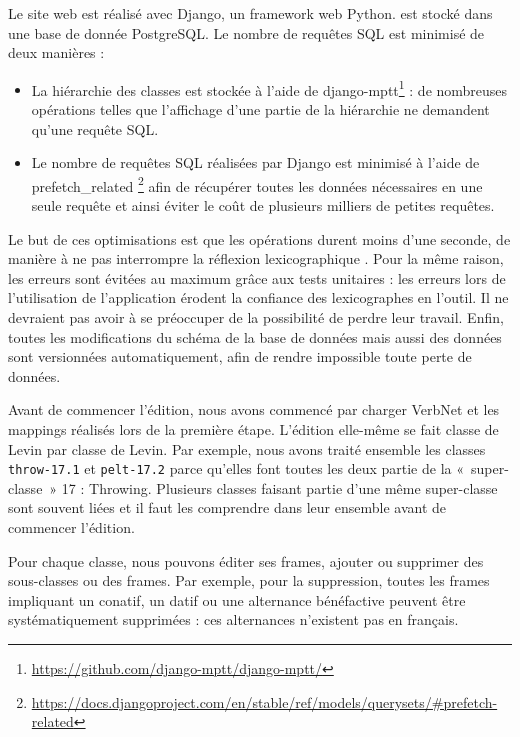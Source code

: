 Le site web est réalisé avec Django, un framework web Python. \verbenet{} est
stocké dans une base de donnée PostgreSQL. Le nombre de requêtes SQL est
minimisé de deux manières :
\begin{itemize}
    \item La hiérarchie des classes est stockée à l'aide de
        django-mptt\footnote{\url{https://github.com/django-mptt/django-mptt/}}
        : de nombreuses opérations telles que l'affichage d'une partie de la
        hiérarchie ne demandent qu'une requête SQL.
    \item Le nombre de requêtes SQL réalisées par Django est minimisé à l'aide
        de prefetch_related
        \footnote{\url{https://docs.djangoproject.com/en/stable/ref/models/querysets/#prefetch-related}}
        afin de récupérer toutes les données nécessaires en une seule requête
        et ainsi éviter le coût de plusieurs milliers de petites requêtes.
\end{itemize}

Le but de ces optimisations est que les opérations durent moins d'une seconde,
de manière à ne pas interrompre la réflexion lexicographique
\citep{nielsen1994response}. Pour la même raison, les erreurs sont évitées au
maximum grâce aux tests unitaires : les erreurs lors de l'utilisation de
l'application érodent la confiance des lexicographes en l'outil. Il ne
devraient pas avoir à se préoccuper de la possibilité de perdre leur travail.
Enfin, toutes les modifications du schéma de la base de données mais aussi des
données sont versionnées automatiquement, afin de rendre impossible toute perte
de données.

Avant de commencer l'édition, nous avons commencé par charger VerbNet et les
mappings réalisés lors de la première étape. L'édition elle-même se fait classe
de Levin par classe de Levin. Par exemple, nous avons traité ensemble les
classes {\color{blue}\texttt{throw-17.1}} et {\color{blue}\texttt{pelt-17.2}}
parce qu'elles font toutes les deux partie de la «~super-classe~» 17 :
Throwing.  Plusieurs classes faisant partie d'une même super-classe sont
souvent liées et il faut les comprendre dans leur ensemble avant de commencer
l'édition.

Pour chaque classe, nous pouvons éditer ses frames, ajouter ou supprimer des
sous-classes ou des frames. Par exemple, pour la suppression, toutes les
frames impliquant un conatif, un datif ou une alternance bénéfactive peuvent
être systématiquement supprimées : ces alternances n'existent pas en français.

